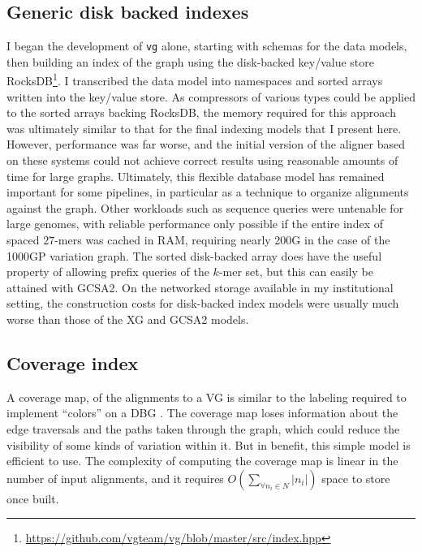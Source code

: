 \subsection{Generic disk backed indexes}
\label{sec:generic_disk_backed_indexes}
I began the development of {\tt vg} alone, starting with schemas for the data models, then building an index of the graph using the disk-backed key/value store RocksDB\footnote{\url{https://github.com/vgteam/vg/blob/master/src/index.hpp}}.
I transcribed the data model into namespaces and sorted arrays written into the key/value store.
As compressors of various types could be applied to the sorted arrays backing RocksDB, the memory required for this approach was ultimately similar to that for the final indexing models that I present here.
However, performance was far worse, and the initial version of the aligner based on these systems could not achieve correct results using reasonable amounts of time for large graphs.
Ultimately, this flexible database model has remained important for some pipelines, in particular as a technique to organize alignments against the graph.
Other workloads such as sequence queries were untenable for large genomes, with reliable performance only possible if the entire index of spaced $27$-mers was cached in RAM, requiring nearly 200G in the case of the 1000GP variation graph.
The sorted disk-backed array does have the useful property of allowing prefix queries of the $k$-mer set, but this can easily be attained with GCSA2.
On the networked storage available in my institutional setting, the construction costs for disk-backed index models were usually much worse than those of the XG and GCSA2 models.

\subsection{Coverage index}
\label{sec:coverage_index}

A coverage map, of the alignments to a VG is similar to the labeling required to implement ``colors'' on a DBG \cite{iqbal2012}.
The coverage map loses information about the edge traversals and the paths taken through the graph, which could reduce the visibility of some kinds of variation within it.
But in benefit, this simple model is efficient to use.
The complexity of computing the coverage map is linear in the number of input alignments, and it requires $O(\sum_{\forall{n_i\in N}}|n_i|)$ space to store once built.

